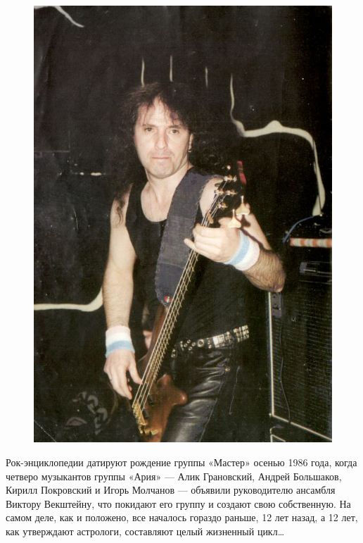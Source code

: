 \documentclass[16pt,a5paper]{book}
\begin{document}
\begin{figure}[!ht]
    \centering
    \includegraphics[width=\paperwidth,height=\paperheight]{Cover2}
    \caption*{}
\end{figure}

\restoregeometry

\maketitle

Рок-энциклопедии датируют рождение группы «Мастер» осенью 1986 года, когда четверо музыкантов группы «Ария» — Алик
Грановский, Андрей Большаков, Кирилл Покровский и Игорь Молчанов — объявили руководителю ансамбля Виктору Векштейну,
что покидают его группу и создают свою собственную. На самом деле, как и положено, все началось гораздо раньше, 12 лет
назад, а 12 лет, как утверждают астрологи, составляют целый жизненный цикл\ldots
\end{document}
